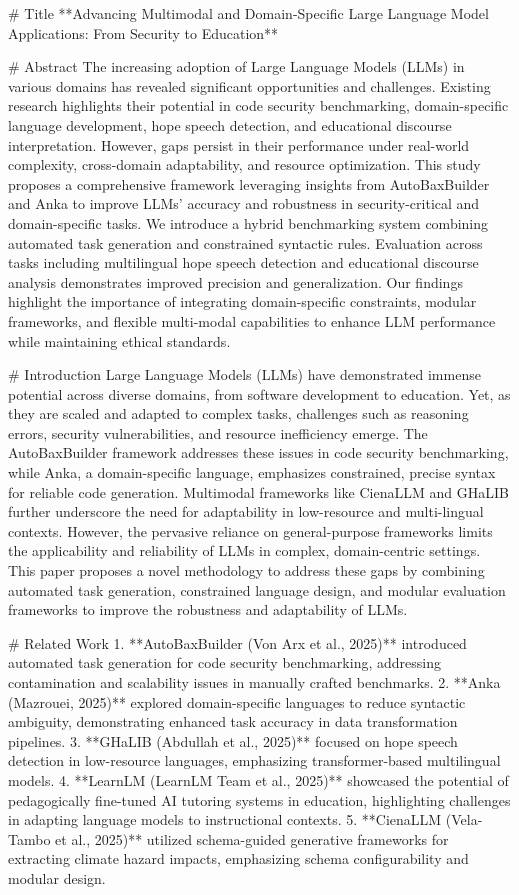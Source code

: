 # Title
**Advancing Multimodal and Domain-Specific Large Language Model Applications: From Security to Education**

# Abstract
The increasing adoption of Large Language Models (LLMs) in various domains has revealed significant opportunities and challenges. Existing research highlights their potential in code security benchmarking, domain-specific language development, hope speech detection, and educational discourse interpretation. However, gaps persist in their performance under real-world complexity, cross-domain adaptability, and resource optimization. This study proposes a comprehensive framework leveraging insights from AutoBaxBuilder and Anka to improve LLMs' accuracy and robustness in security-critical and domain-specific tasks. We introduce a hybrid benchmarking system combining automated task generation and constrained syntactic rules. Evaluation across tasks including multilingual hope speech detection and educational discourse analysis demonstrates improved precision and generalization. Our findings highlight the importance of integrating domain-specific constraints, modular frameworks, and flexible multi-modal capabilities to enhance LLM performance while maintaining ethical standards.

# Introduction
Large Language Models (LLMs) have demonstrated immense potential across diverse domains, from software development to education. Yet, as they are scaled and adapted to complex tasks, challenges such as reasoning errors, security vulnerabilities, and resource inefficiency emerge. The AutoBaxBuilder framework addresses these issues in code security benchmarking, while Anka, a domain-specific language, emphasizes constrained, precise syntax for reliable code generation. Multimodal frameworks like CienaLLM and GHaLIB further underscore the need for adaptability in low-resource and multi-lingual contexts. However, the pervasive reliance on general-purpose frameworks limits the applicability and reliability of LLMs in complex, domain-centric settings. This paper proposes a novel methodology to address these gaps by combining automated task generation, constrained language design, and modular evaluation frameworks to improve the robustness and adaptability of LLMs.

# Related Work
1. **AutoBaxBuilder (Von Arx et al., 2025)** introduced automated task generation for code security benchmarking, addressing contamination and scalability issues in manually crafted benchmarks.
2. **Anka (Mazrouei, 2025)** explored domain-specific languages to reduce syntactic ambiguity, demonstrating enhanced task accuracy in data transformation pipelines.
3. **GHaLIB (Abdullah et al., 2025)** focused on hope speech detection in low-resource languages, emphasizing transformer-based multilingual models.
4. **LearnLM (LearnLM Team et al., 2025)** showcased the potential of pedagogically fine-tuned AI tutoring systems in education, highlighting challenges in adapting language models to instructional contexts.
5. **CienaLLM (Vela-Tambo et al., 2025)** utilized schema-guided generative frameworks for extracting climate hazard impacts, emphasizing schema configurability and modular design.

